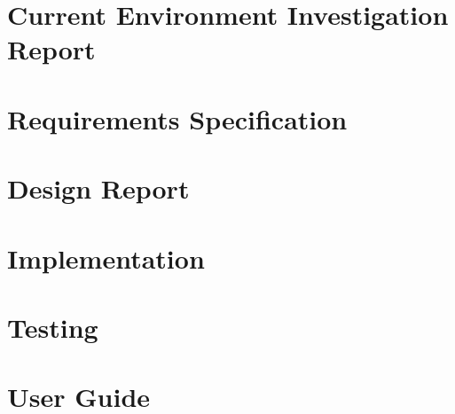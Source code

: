 \documentclass[preprint,12pt,review,authoryear]{elsarticle}
\begin{document}
\section{Current Environment Investigation Report}
\renewcommand{\thepage}{D\arabic{page}}
\newpage
\section{Requirements Specification}
\renewcommand{\thepage}{E\arabic{page}}
\newpage
\section{Design Report}
\renewcommand{\thepage}{F\arabic{page}}
\newpage
\section{Implementation}
\renewcommand{\thepage}{G\arabic{page}}
\newpage
\section{Testing}
\renewcommand{\thepage}{H\arabic{page}}
\newpage
\section{User Guide}
\renewcommand{\thepage}{I\arabic{page}}
\newpage
\end{document}
